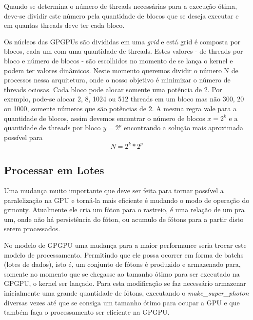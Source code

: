     Quando se determina o número de threads necessárias para a execução ótima, deve-se dividir este número pela quantidade de blocos que se deseja executar e em quantas threads deve ter cada bloco.

    Os núcleos das GPGPUs são divididas em uma \textit{grid} e está grid é composta por blocos, cada um com uma quantidade de threads. Estes valores - de threads por bloco e número de blocos - são escolhidos no momento de se lança o kernel e podem ter valores dinâmicos. Neste momento queremos dividir o número N de processos nessa arquitetura, onde o nosso objetivo é minimizar o número de threads ociosas. Cada bloco pode alocar somente uma potência de 2. Por exemplo, pode-se alocar 2, 8, 1024 ou 512 threads em um bloco mas não 300, 20 ou 1000, somente números que são potências de 2. A mesma regra vale para a quantidade de blocos, assim devemos encontrar o número de blocos $ x = 2^k $ e a quantidade de threads por bloco $ y = 2^p $ encontrando a solução mais aproximada possível para $$ N = 2^k  * 2^p $$


  \subsection{Processar em Lotes}
    Uma mudança muito importante que deve ser feita para tornar possível a paralelização na GPU e torná-la mais eficiente é mudando o modo de operação do grmonty. Atualmente ele cria um fóton para o rastreio, é uma relação de um pra um, onde não há persistência do fóton, ou acumulo de fótons para a partir disto serem processados.

    No modelo de GPGPU uma mudança para a maior performance seria trocar este modelo de processamento. Permitindo que ele possa ocorrer em forma de batchs (lotes de dados), isto é, um conjunto de fótons é produzido e armazenado para, somente no momento que se chegasse ao tamanho ótimo para ser executado na GPGPU, o kernel ser lançado. Para esta modificação se faz necessário armazenar inicialmente uma grande quantidade de fótons, executando o \textit{make\_super\_photon} diversas vezes até que se consiga um tamanho ótimo para ocupar a GPU e que também faça o processamento ser eficiente na GPGPU.
